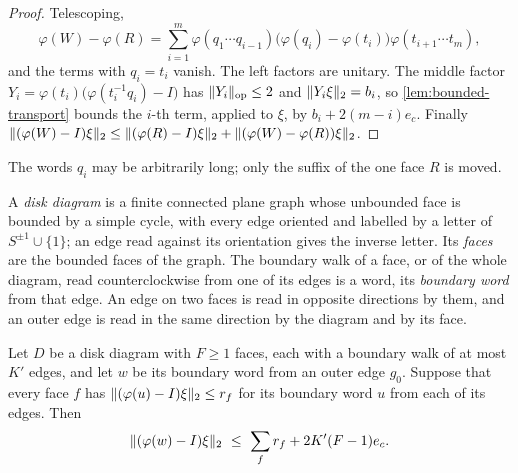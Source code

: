 \begin{proof}
Telescoping,
\[
\varphi(W)-\varphi(R)=\sum_{i=1}^m\varphi(q_1\cdots q_{i-1})\bigl(\varphi(q_i)-\varphi(t_i)\bigr)\varphi(t_{i+1}\cdots t_m),
\]
and the terms with $q_i=t_i$ vanish. The left factors are unitary. The middle factor
$Y_i=\varphi(t_i)\bigl(\varphi(t_i^{-1}q_i)-I\bigr)$ has $\lVert Y_i\rVert_{\mathrm{op}}\le2$ and $\lVert Y_i\xi\rVert_2=b_i$, so \cref{lem:bounded-transport}
bounds the $i$-th term, applied to $\xi$, by $b_i+2(m-i)e_c$. Finally
$\lVert (\varphi(W)-I)\xi\rVert_2\le\lVert (\varphi(R)-I)\xi\rVert_2+\lVert (\varphi(W)-\varphi(R))\xi\rVert_2$.
\end{proof}

The words $q_i$ may be arbitrarily long; only the suffix of the one face $R$ is moved.

A \emph{disk diagram} is a finite connected plane graph whose unbounded face is bounded by a simple cycle, with every edge
oriented and labelled by a letter of $S^{\pm1}\cup\{1\}$; an edge read against its orientation gives the inverse letter. Its
\emph{faces} are the bounded faces of the graph. The boundary walk of a face, or of the whole diagram, read counterclockwise
from one of its edges is a word, its \emph{boundary word} from that edge. An edge on two faces is read in opposite directions by
them, and an outer edge is read in the same direction by the diagram and by its face.

\begin{lemma}\label{lem:face-tree}
Let $D$ be a disk diagram with $F\ge1$ faces, each with a boundary walk of at most $K'$ edges, and let $w$ be its boundary word
from an outer edge $g_0$. Suppose that every face $f$ has $\lVert (\varphi(u)-I)\xi\rVert_2\le r_f$ for its boundary word $u$ from each of
its edges. Then
\[
\hs{(\varphi(w)-I)\xi}\ \le\ \sum_fr_f+2K'(F-1)e_c .
\]
\end{lemma}

